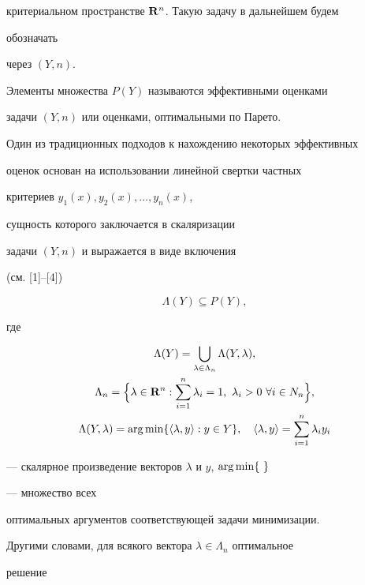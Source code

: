 критериальном пространстве $\bold R^n$. Такую задачу в дальнейшем будем 


обозначать 


через $(Y,n)$. 


 


Элементы множества $P(Y)$ называются эффективными оценками 


задачи $(Y,n)$ или оценками, оптимальными по Парето. 


 


Один из традиционных подходов к нахождению некоторых эффективных 


оценок основан на использовании линейной свертки частных 


критериев $y_1(x),y_2(x),\dotsc,y_n(x)$, 


сущность которого заключается в скаляризации 


задачи $(Y,n)$ и выражается в виде включения 


(см. [1]--[4]) 


$$ 


\Lambda(Y)\subseteq P(Y), 


$$ 


где 


\begin{gather*} 


\Lambda(Y)=\bigcup_{\lambda\in\Lambda_n}\Lambda(Y,\lambda),\\ 


\Lambda_n=\Big\{\lambda\in\bold R^n:\sum^n_{i=1}\lambda_i=1,\  


\lambda_i>0\ \forall i\in N_n\Big\},\\ 


\Lambda(Y,\lambda)=\argmin\{\la\lambda,y\ra:y\in Y\},\quad


\la\lambda,y\ra=\sum^n_{i=1}\lambda_i y_i 


\end{gather*} 


--- скалярное произведение векторов $\lambda$ и $y$, $\operatorname{arg\,min}\{\ \}$ 


--- множество всех 


оптимальных аргументов соответствующей задачи минимизации. 


 


Другими словами, для всякого вектора $\lambda\in\Lambda_n$ оптимальное 


решение 


